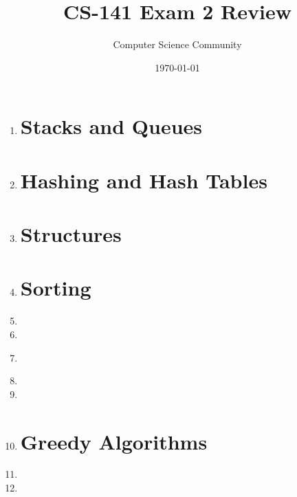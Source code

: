 \documentclass[11pt]{article}
\title{CS-141 Exam 2 Review}
\author{Computer Science Community}
\date{\today}
\begin{document}
\header

\begin{enumerate}

\section*{Linked Lists}
    \item 

\pagebreak
\section*{Stacks and Queues}
	\item 

\pagebreak
\section*{Hashing and Hash Tables}
	\item 

\section*{Structures}
	\item 

\newpage
\section*{Sorting}
	\item 

	\item 

	\item \label{qsort-worst-case} 

	\item 

	\item 

\newpage
	\item 
	
\newpage
\section*{Greedy Algorithms}
	\item 
	
	\vspace{.25in}
	
	\item 

\end{enumerate}
\end{document}
